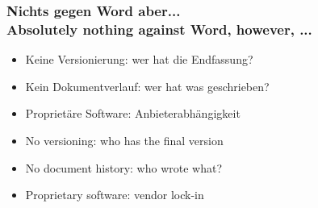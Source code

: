 \documentclass[13pt]{beamer}
\begin{document}
\begin{frame}
  \frametitle{Nichts gegen Word\textsuperscript{\tiny\textregistered} aber... \\
    \textcolor{mfn_green}{Absolutely nothing against Word\textsuperscript{\tiny\textregistered}, however, ...}}
  \begin{itemize}
  \item{Keine Versionierung: wer hat die Endfassung?}
  \item{Kein Dokumentverlauf: wer hat was geschrieben?}
  \item{Proprietäre Software: Anbieterabhängigkeit}
  \end{itemize}
  
  \begin{itemize}
  \item{\textcolor{mfn_green}{No versioning: who has the final version}}
  \item{\textcolor{mfn_green}{No document history: who wrote what?}}
  \item{\textcolor{mfn_green}{Proprietary software: vendor lock-in}}
  \end{itemize}
\end{frame}
\end{document}
